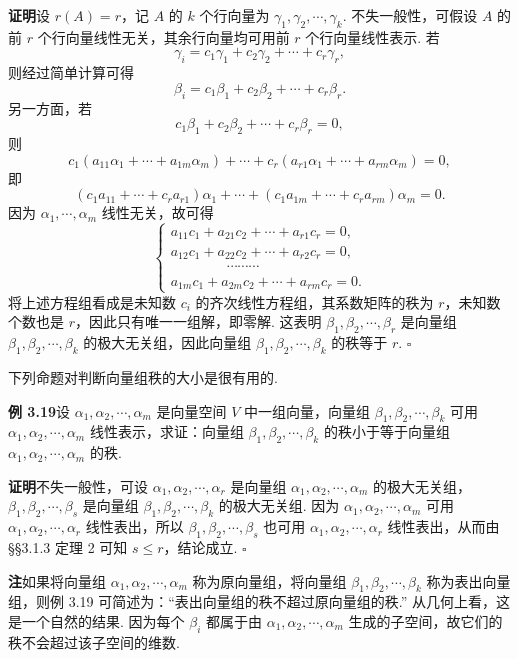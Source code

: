 \documentclass[UTF8,12pt,a4paper,fontset=fandol]{ctexart}
\begin{document}
\noindent\textbf{证明}\quad 设 $r(A)=r$，记 $A$ 的 $k$ 个行向量为 $\gamma_1,\gamma_2,\cdots,\gamma_k$. 不失一般性，可假设 $A$ 的前 $r$ 个行向量线性无关，其余行向量均可用前 $r$ 个行向量线性表示. 若
\[
\gamma_i=c_1\gamma_1+c_2\gamma_2+\cdots+c_r\gamma_r,
\]
则经过简单计算可得
\[
\beta_i=c_1\beta_1+c_2\beta_2+\cdots+c_r\beta_r.
\]
另一方面，若
\[
c_1\beta_1+c_2\beta_2+\cdots+c_r\beta_r=0,
\]
则
\[
c_1(a_{11}\alpha_1+\cdots+a_{1m}\alpha_m)+\cdots+c_r(a_{r1}\alpha_1+\cdots+a_{rm}\alpha_m)=0,
\]
即
\[
(c_1a_{11}+\cdots+c_ra_{r1})\alpha_1+\cdots+(c_1a_{1m}+\cdots+c_ra_{rm})\alpha_m=0.
\]
因为 $\alpha_1,\cdots,\alpha_m$ 线性无关，故可得
\[
\left\{
\begin{array}{l}
a_{11}c_1+a_{21}c_2+\cdots+a_{r1}c_r=0,\\
a_{12}c_1+a_{22}c_2+\cdots+a_{r2}c_r=0,\\
\hspace{4em}\cdots\cdots\cdots\\
a_{1m}c_1+a_{2m}c_2+\cdots+a_{rm}c_r=0.
\end{array}
\right.
\]
将上述方程组看成是未知数 $c_i$ 的齐次线性方程组，其系数矩阵的秩为 $r$，未知数个数也是 $r$，因此只有唯一一组解，即零解. 这表明 $\beta_1,\beta_2,\cdots,\beta_r$ 是向量组 $\beta_1,\beta_2,\cdots,\beta_k$ 的极大无关组，因此向量组 $\beta_1,\beta_2,\cdots,\beta_k$ 的秩等于 $r$. $\square$

下列命题对判断向量组秩的大小是很有用的.

\noindent\textbf{例 3.19}\quad 设 $\alpha_1,\alpha_2,\cdots,\alpha_m$ 是向量空间 $V$ 中一组向量，向量组 $\beta_1,\beta_2,\cdots,\beta_k$ 可用 $\alpha_1,\alpha_2,\cdots,\alpha_m$ 线性表示，求证：向量组 $\beta_1,\beta_2,\cdots,\beta_k$ 的秩小于等于向量组 $\alpha_1,\alpha_2,\cdots,\alpha_m$ 的秩.

\noindent\textbf{证明}\quad 不失一般性，可设 $\alpha_1,\alpha_2,\cdots,\alpha_r$ 是向量组 $\alpha_1,\alpha_2,\cdots,\alpha_m$ 的极大无关组，$\beta_1,\beta_2,\cdots,\beta_s$ 是向量组 $\beta_1,\beta_2,\cdots,\beta_k$ 的极大无关组. 因为 $\alpha_1,\alpha_2,\cdots,\alpha_m$ 可用 $\alpha_1,\alpha_2,\cdots,\alpha_r$ 线性表出，所以 $\beta_1,\beta_2,\cdots,\beta_s$ 也可用 $\alpha_1,\alpha_2,\cdots,\alpha_r$ 线性表出，从而由 §§3.1.3 定理 2 可知 $s\le r$，结论成立. $\square$

\noindent\textbf{注}\quad 如果将向量组 $\alpha_1,\alpha_2,\cdots,\alpha_m$ 称为原向量组，将向量组 $\beta_1,\beta_2,\cdots,\beta_k$ 称为表出向量组，则例 3.19 可简述为：“表出向量组的秩不超过原向量组的秩.” 从几何上看，这是一个自然的结果. 因为每个 $\beta_i$ 都属于由 $\alpha_1,\alpha_2,\cdots,\alpha_m$ 生成的子空间，故它们的秩不会超过该子空间的维数.
\end{document}
